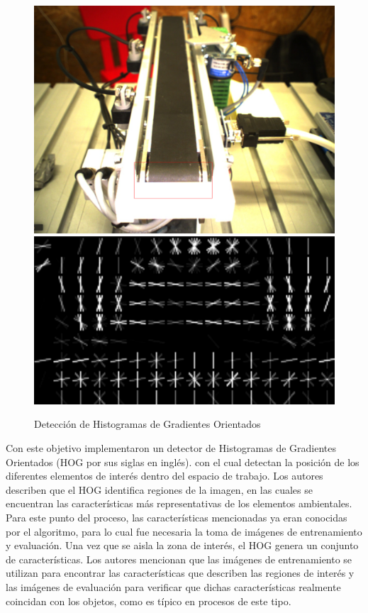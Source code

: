 \begin{figure}[H]
    \centering
    \includegraphics[scale=0.15]{Figures/Conveyor_GRIPS_TDP.png}     \includegraphics[scale=0.2]{Figures/Conveyor_HOG_GRIPS_TDP.png}
        \caption{Detección de Histogramas de Gradientes Orientados \cite{furbaß_robocup_2021}}
        \label{fig:HOG_GRIPS}
    \end{figure}

Con este objetivo implementaron un detector de Histogramas de Gradientes Orientados (HOG por sus siglas en inglés). con el cual detectan la posición de los diferentes elementos de interés dentro del espacio de trabajo. Los autores describen que el HOG identifica regiones de la imagen, en las cuales se encuentran las características más representativas de los elementos ambientales. Para este punto del proceso, las características mencionadas ya eran conocidas por el algoritmo, para lo cual fue necesaria la toma de imágenes de entrenamiento y evaluación. Una vez que se aisla la zona de interés, el HOG genera un conjunto de características. Los autores mencionan que las imágenes de entrenamiento se utilizan para encontrar las características que describen las regiones de interés y las imágenes de evaluación para verificar que dichas características realmente coincidan con los objetos, como es típico en procesos de este tipo.

